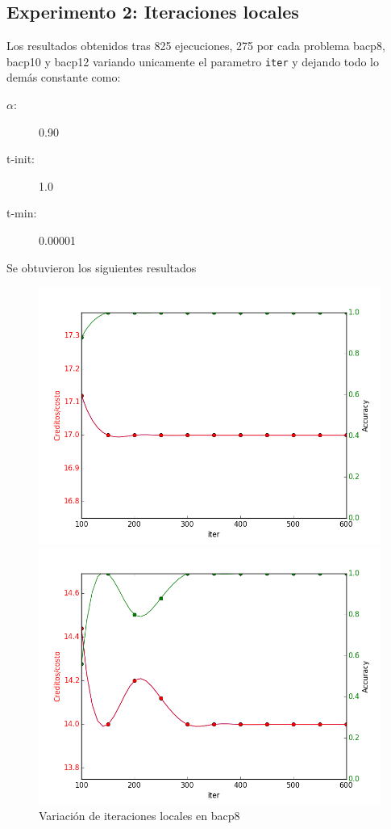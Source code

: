 \documentclass[letterpaper,10pt]{article}
\begin{document}
\subsection{Experimento 2: Iteraciones locales}

Los resultados obtenidos tras 825 ejecuciones, 275 por cada problema bacp8, bacp10 y bacp12 variando unicamente el parametro \texttt{iter} y dejando todo lo demás constante como:

\begin{description}
    \item[$\alpha$:] 0.90
    \item[t-init:] 1.0
    \item[t-min:] 0.00001
\end{description}
Se obtuvieron los siguientes resultados

\begin{figure}[H]
        \includegraphics[width=\linewidth]{img/2-iter-bacp8.png}
        \caption{Variación de iteraciones locales en bacp8}
        \label{fig:iter1}
    \endminipage\hfill
        \includegraphics[width=\linewidth]{img/2-iter-bacp10.png}

\end{figure}
\end{document}
